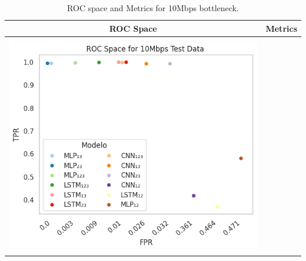 \begin{table}
	\centering
	\caption{ROC space and Metrics for 10Mbps bottleneck.}	
	\begin{tabular*}{\textwidth}{@{} CC@{} }
		\hline
		\toprule
		ROC Space & Metrics \\ \hline
		\midrule	
		& \\
		
		\begin{minipage}{0.55\textwidth}
			
			\hspace{0.5cm}
			\includegraphics[width=.60\textwidth]{./figs/ROC-Space-Test-Data-10Mbps.png}
			\subcaption{ }
			\label{fig:desempenhoteste}
		\end{minipage}
		\hfil
		&
		\begin{minipage}{0.45\textwidth}
			\begingroup
			\begin{tiny}	
				\setlength{\tabcolsep}{3pt}
				\renewcommand{\arraystretch}{1.15}
				

\end{tiny}
\end{minipage}
\end{tabular*}
\end{table}
